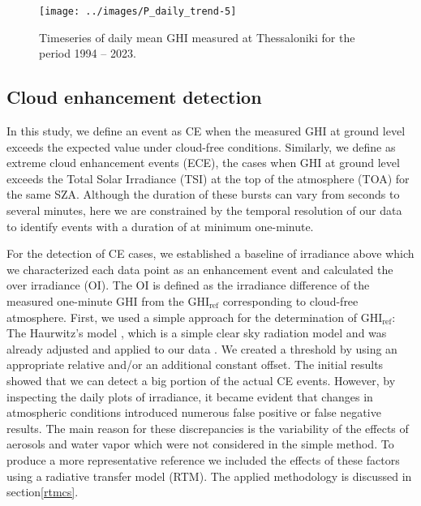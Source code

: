\documentclass[preprint, 5p,
authoryear]{elsarticle} %
\begin{document}
\begin{figure}

{\centering \texttt{[image: ../images/P\_daily\_trend-5]} 

}

\caption{Timeseries of daily mean GHI measured at Thessaloniki for the period 1994 -- 2023.}\label{fig:CLB-daily}
\end{figure}

\hypertarget{cloud-enhancement-detection}{%
\subsection{Cloud enhancement
detection}\label{cloud-enhancement-detection}}

In this study, we define an event as CE when the measured GHI at ground
level exceeds the expected value under cloud-free conditions. Similarly,
we define as extreme cloud enhancement events (ECE), the cases when GHI
at ground level exceeds the Total Solar Irradiance (TSI) at the top of
the atmosphere (TOA) for the same SZA. Although the duration of these
bursts can vary from seconds to several minutes, here we are constrained
by the temporal resolution of our data to identify events with a
duration of at minimum one-minute.

For the detection of CE cases, we established a baseline of irradiance
above which we characterized each data point as an enhancement event and
calculated the over irradiance (OI). The OI is defined as the irradiance
difference of the measured one-minute GHI from the
\(\text{GHI}_\text{ref}\) corresponding to cloud-free atmosphere. First,
we used a simple approach for the determination of
\(\text{GHI}_\text{ref}\): The Haurwitz's model \citep{Haurwitz1945},
which is a simple clear sky radiation model and was already adjusted and
applied to our data \citep{Natsis2023}. We created a threshold by using
an appropriate relative and/or an additional constant offset. The
initial results showed that we can detect a big portion of the actual CE
events. However, by inspecting the daily plots of irradiance, it became
evident that changes in atmospheric conditions introduced numerous false
positive or false negative results. The main reason for these
discrepancies is the variability of the effects of aerosols and water
vapor which were not considered in the simple method. To produce a more
representative reference we included the effects of these factors using
a radiative transfer model (RTM). The applied methodology is discussed
in section\nobreakspace{}\ref{rtmcs}.
\end{document}
